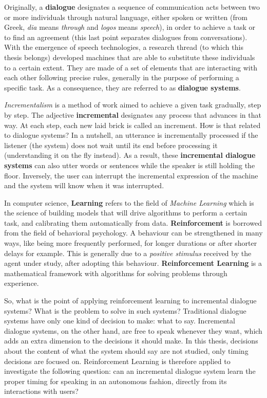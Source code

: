         Originally, a \textbf{dialogue} designates a sequence of communication acts between two or more individuals through natural language, either spoken or written (from Greek, \textit{dia} means \textit{through} and \textit{logos} means \textit{speech}), in order to achieve a task or to find an agreement (this last point separates dialogues from conversations). With the emergence of speech technologies, a research thread (to which this thesis belongs) developed machines that are able to substitute these individuals to a certain extent. They are made of a set of elements that are interacting with each other following precise rules, generally in the purpose of performing a specific task. As a consequence, they are referred to as \textbf{dialogue systems}.

        \textit{Incrementalism} is a method of work aimed to achieve a given task gradually, step by step. The adjective \textbf{incremental} designates any process that advances in that way. At each step, each new laid brick is called an increment. How is that related to dialogue systems? In a nutshell, an utterance is incrementally processed if the listener (the system) does not wait until its end before processing it (understanding it on the fly instead). As a result, these \textbf{incremental dialogue systems} can also utter words or sentences while the speaker is still holding the floor. Inversely, the user can interrupt the incremental expression of the machine and the system will know when it was interrupted.

        In computer science, \textbf{Learning} refers to the field of \textit{Machine Learning} which is the science of building models that will drive algorithms to perform a certain task, and calibrating them automatically from data. \textbf{Reinforcement} is borrowed from the field of behavioral psychology. A behaviour can be strengthened in many ways, like being more frequently performed, for longer durations or after shorter delays for example. This is generally due to a \textit{positive stimulus} received by the agent under study, after adopting this behaviour. \textbf{Reinforcement Learning} is a mathematical framework with algorithms for solving problems through experience.

        So, what is the point of applying reinforcement learning to incremental dialogue systems? What is the problem to solve in such systems? Traditional dialogue systems have only one kind of decision to make: what to say. Incremental dialogue systems, on the other hand, are free to speak whenever they want, which adds an extra dimension to the decisions it should make. In this thesis, decisions about the content of what the system should say are not studied, only timing decisions are focused on. Reinforcement Learning is therefore applied to investigate the following question: can an incremental dialogue system learn the proper timing for speaking in an autonomous fashion, directly from its interactions with users?
				
